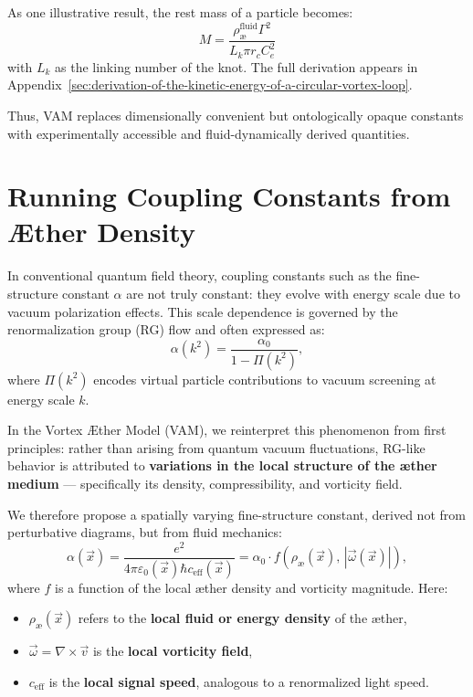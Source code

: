 As one illustrative result, the rest mass of a particle becomes:
\[
M = \frac{\rho_\text{\ae}^{\text{fluid}} \Gamma^2}{L_k \pi r_c C_e^2}
\]
with \( L_k \) as the linking number of the knot. The full derivation appears in Appendix~\ref{sec:derivation-of-the-kinetic-energy-of-a-circular-vortex-loop}.

Thus, VAM replaces dimensionally convenient but ontologically opaque constants with experimentally accessible and fluid-dynamically derived quantities.
\section{Running Coupling Constants from Æther Density}

In conventional quantum field theory, coupling constants such as the fine-structure constant \( \alpha \) are not truly constant: they evolve with energy scale due to vacuum polarization effects. This scale dependence is governed by the renormalization group (RG) flow and often expressed as:
\begin{equation}
\alpha(k^2) = \frac{\alpha_0}{1 - \Pi(k^2)},
\end{equation}
where \( \Pi(k^2) \) encodes virtual particle contributions to vacuum screening at energy scale \( k \).

\vspace{0.5em}

In the Vortex Æther Model (VAM), we reinterpret this phenomenon from first principles: rather than arising from quantum vacuum fluctuations, RG-like behavior is attributed to \textbf{variations in the local structure of the æther medium} — specifically its density, compressibility, and vorticity field.

We therefore propose a spatially varying fine-structure constant, derived not from perturbative diagrams, but from fluid mechanics:
\begin{equation}
\alpha(\vec{x}) = \frac{e^2}{4\pi \varepsilon_0(\vec{x}) \hbar c_{\text{eff}}(\vec{x})} = \alpha_0 \cdot f\left( \rho_\text{\ae}(\vec{x}), \, |\vec{\omega}(\vec{x})| \right),
\end{equation}
where \( f \) is a function of the local æther density and vorticity magnitude. Here:

\begin{itemize}
    \item \( \rho_\text{\ae}(\vec{x}) \) refers to the \textbf{local fluid or energy density} of the æther,
    \item \( \vec{\omega} = \nabla \times \vec{v} \) is the \textbf{local vorticity field},
    \item \( c_{\text{eff}} \) is the \textbf{local signal speed}, analogous to a renormalized light speed.
\end{itemize}

